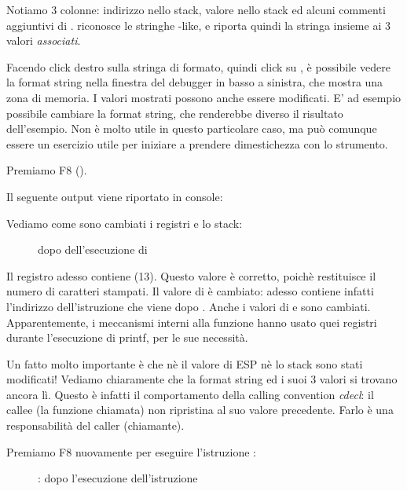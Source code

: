 Notiamo 3 colonne: indirizzo nello stack, valore nello stack ed alcuni commenti aggiuntivi di \olly.
\olly riconosce le stringhe \printf{}-like, e riporta quindi la stringa insieme ai 3 valori \emph{associati}.

Facendo click destro sulla stringa di formato, quindi click su ,
è possibile vedere la format string nella finestra del debugger in basso a sinistra, che mostra una zona di memoria.
I valori mostrati possono anche essere modificati.
E' ad esempio possibile cambiare la format string, che renderebbe diverso il risultato dell'esempio.
Non è molto utile in questo particolare caso, ma può comunque essere un esercizio utile per iniziare a prendere dimestichezza con lo strumento.

\clearpage
Premiamo F8 (\stepover).

Il seguente output viene riportato in console:



Vediamo come sono cambiati i registri e lo stack:

\begin{figure}[H]
\centering
{}
\caption{\olly dopo dell'esecuzione di \printf{}}
\label{fig:printf3_olly_3}
\end{figure}

Il registro \EAX adesso contiene  (13).
Questo valore è corretto, poichè \printf restituisce il numero di caratteri stampati.
Il valore di \EIP è cambiato: adesso contiene infatti l'indirizzo dell'istruzione che viene dopo .
Anche i valori di \ECX e \EDX sono cambiati.
Apparentemente, i meccanismi interni alla funzione \printf hanno usato quei registri durante l'esecuzione di printf, per le sue necessità.

Un fatto molto importante è che nè il valore di ESP nè lo stack sono stati modificati!
Vediamo chiaramente che la format string ed i suoi 3 valori si trovano ancora lì.
Questo è infatti il comportamento della calling convention \emph{cdecl}: il \gls{callee} (la funzione chiamata) non ripristina
\ESP al suo valore precedente.
Farlo è una responsabilità del \gls{caller} (chiamante).

\clearpage
Premiamo F8 nuovamente per eseguire l'istruzione :

\begin{figure}[H]
\centering
{}
\caption{\olly: dopo l'esecuzione dell'istruzione }
\label{fig:printf3_olly_4}
\end{figure}

